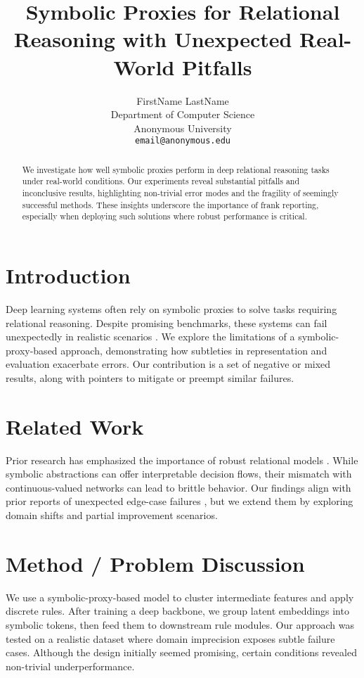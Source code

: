 \documentclass{article}
\title{\textbf{Symbolic Proxies for Relational Reasoning with Unexpected Real-World Pitfalls}}
\author{
    FirstName LastName \\
    Department of Computer Science \\
    Anonymous University \\
    \texttt{email@anonymous.edu}
}
\date{}
\begin{document}
\maketitle

\begin{abstract}
We investigate how well symbolic proxies perform in deep relational reasoning tasks under real-world conditions. Our experiments reveal substantial pitfalls and inconclusive results, highlighting non-trivial error modes and the fragility of seemingly successful methods. These insights underscore the importance of frank reporting, especially when deploying such solutions where robust performance is critical.
\end{abstract}

\section{Introduction}
Deep learning systems often rely on symbolic proxies to solve tasks requiring relational reasoning. Despite promising benchmarks, these systems can fail unexpectedly in realistic scenarios \citep{clark2020assessing, smith2022pitfalls}. We explore the limitations of a symbolic-proxy-based approach, demonstrating how subtleties in representation and evaluation exacerbate errors. Our contribution is a set of negative or mixed results, along with pointers to mitigate or preempt similar failures.

\section{Related Work}
Prior research has emphasized the importance of robust relational models \citep{lee2019advanced}. While symbolic abstractions can offer interpretable decision flows, their mismatch with continuous-valued networks can lead to brittle behavior. Our findings align with prior reports of unexpected edge-case failures \citep{smith2022pitfalls}, but we extend them by exploring domain shifts and partial improvement scenarios.

\section{Method / Problem Discussion}
We use a symbolic-proxy-based model to cluster intermediate features and apply discrete rules. After training a deep backbone, we group latent embeddings into symbolic tokens, then feed them to downstream rule modules. Our approach was tested on a realistic dataset where domain imprecision exposes subtle failure cases. Although the design initially seemed promising, certain conditions revealed non-trivial underperformance.
\end{document}
